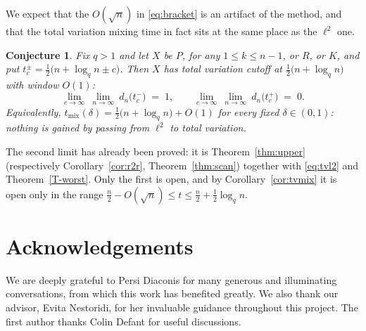 \documentclass[11pt]{article}
\theoremstyle{plain}  %
\newtheorem{remark}[theorem]{Remark}
\newtheorem{Con}[theorem]{Conjecture}
\begin{document}



We expect that the $O(\sqrt n)$ in \eqref{eq:bracket} is an artifact of the method, and
that the total variation mixing time in fact sits at the same place as the $\ell^{2}$ one.

\begin{Con}\label{conj:tvcutoff}
Fix $q>1$ and let $X$ be $P$, for any $1\le k\le n-1$, or $R$, or $K$, and put
$t^{\pm}_{c} = \frac12\bigl(n+\log_q n \pm c\bigr)$. Then $X$ has total variation cutoff
at $\frac12\bigl(n+\log_q n\bigr)$ with window $O(1)$:
$$
  \lim_{c\to\infty}\ \lim_{n\to\infty}\
    d_n\bigl( t^{-}_{c}\bigr) \;=\; 1,
  \qquad
  \lim_{c\to\infty}\ \lim_{n\to\infty}\
    d_n\bigl( t^{+}_{c}\bigr) \;=\; 0 .
$$
Equivalently, $t_{\mathrm{mix}}(\delta) = \frac12\bigl(n+\log_q n\bigr)+O(1)$ for every
fixed $\delta\in(0,1)$: nothing is gained by passing from $\ell^{2}$ to
total variation.
\end{Con}

The second limit has already been proved: it is Theorem~\ref{thm:upper} (respectively
Corollary~\ref{cor:r2r}, Theorem~\ref{thm:scan}) together with \eqref{eq:tvl2} and
Theorem~\ref{T-worst}. Only the first is open, and by
Corollary~\ref{cor:tvmix} it is open only in the range
$\frac n2 - O(\sqrt n) \le t \le \frac n2 + \frac12\log_q n$.




\section*{Acknowledgements}

We are deeply grateful to Persi Diaconis for many generous and illuminating conversations, from which this work has benefited greatly. We also thank our advisor, Evita Nestoridi, for her invaluable guidance throughout
this project. The first author thanks Colin Defant for useful discussions.
\end{document}
